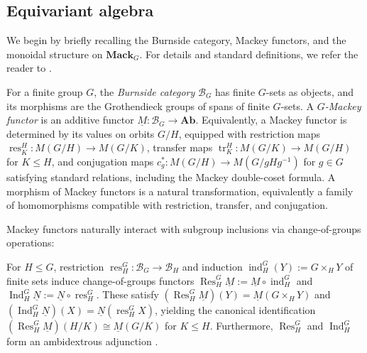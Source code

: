 \documentclass[11pt,oneside]{amsart}
\DeclareMathOperator{\ind}{ind}
\DeclareMathOperator{\res}{res}
\DeclareMathOperator{\tr}{tr}
\numberwithin{equation}{section}
\numberwithin{figure}{section}
\theoremstyle{plain}
\theoremstyle{definition}
\theoremstyle{remark}
\begin{document}
 


 

\subsection{Equivariant algebra}
We begin by briefly recalling the Burnside category, Mackey functors, and the monoidal structure on \(\mathbf{Mack}_G\). For   details and standard definitions, we refer the reader to \cite{green1971, dress1971notes}.

\begin{definition}
For a finite group $G$, the \emph{Burnside category} $\mathcal{B}_G$ has finite $G$-sets as objects, and its morphisms are the Grothendieck groups of spans of finite $G$-sets. A \emph{\(G\)-Mackey functor} is an additive functor $\underline M\colon\mathcal B_G\to\mathbf{Ab}$. 
Equivalently, a Mackey functor is determined by its values on orbits $G/H$, equipped with restriction maps $\res_K^H\colon M(G/H)\to M(G/K)$, transfer maps $\tr_K^H\colon M(G/K)\to M(G/H)$ for $K\le H$, and conjugation maps $c_g^*\colon M(G/H)\to M(G/gHg^{-1})$ for $g\in G$ satisfying standard relations, including the Mackey double-coset formula.
A morphism of Mackey functors is a natural
transformation, equivalently a family of homomorphisms compatible
with restriction, transfer, and conjugation.
\end{definition}
 Mackey functors naturally interact with subgroup inclusions via change-of-groups operations:
 
\begin{definition}\label{def:mackey-change-of-groups}
For \(H\leq G\), restriction \(\res_H^G\colon\mathcal B_G\to\mathcal B_H\) and induction \(\ind_H^G(Y) := G\times_HY\) of finite sets induce change-of-groups functors \(\operatorname{Res}_H^G \underline{M} := \underline{M}\circ\ind_H^G\) and \(\operatorname{Ind}_H^G \underline{N} := \underline{N}\circ\res_H^G\). These satisfy \((\operatorname{Res}_H^G \underline{M})(Y) = \underline{M}(G\times_HY)\) and \((\operatorname{Ind}_H^G \underline{N})(X) = \underline{N}(\res_H^G X)\), yielding the canonical identification \((\operatorname{Res}_H^G \underline{M})(H/K) \cong \underline{M}(G/K)\) for \(K\leq H\). Furthermore, \(\operatorname{Res}_H^G\) and \(\operatorname{Ind}_H^G\) form an ambidextrous adjunction \cite{thevenaz1995structure}.
\end{definition}

 


 
\end{document}
